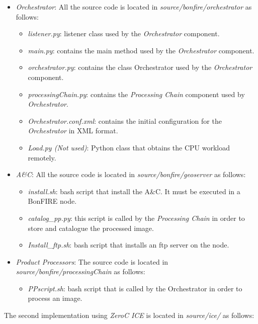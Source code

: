 \begin{itemize}
\item \emph{Orchestrator}: All the source code is located in \emph{source/bonfire/orchestrator} as follows:
\begin{itemize}
\item \emph{listener.py}: listener class used by the \emph{Orchestrator} component.
\item \emph{main.py}: contains the main method used by the \emph{Orchestrator} component.
\item \emph{orchestrator.py}: contains the class Orchestrator used by the \emph{Orchestrator} component.
\item \emph{processingChain.py}: contains the \emph{Processing Chain} component used by \emph{Orchestrator}.
\item \emph{Orchestrator.conf.xml}: contains the initial configuration for the \emph{Orchestrator} in \ac{XML} format.
\item \emph{Load.py (Not used)}: Python class that obtains the CPU workload
  remotely.  
\end{itemize}
\item \emph{A\&C}: All the source code is located in \emph{source/bonfire/geoserver} as
  follows:
\begin{itemize}
\item \emph{install.sh}: bash script that install the A\&C. It must be executed in a BonFIRE node.
\item \emph{catalog\_pp.py}: this script is called by the \emph{Processing Chain} in order to store and catalogue the processed image.
\item \emph{Install\_ftp.sh}: bash script that installs an ftp server on the node.
\end{itemize}
\item \emph{Product Processors}: The source code is located in \emph{source/bonfire/processingChain} as follows:
\begin{itemize}
\item \emph{PPscript.sh}: bash script that is called by the Orchestrator in
  order to process an image. 
\end{itemize}
\end{itemize}

The second implementation using \emph{ZeroC ICE} is located in
\emph{source/ice/} as follows:

